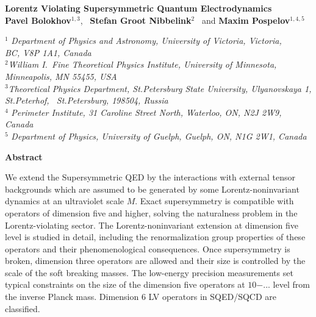 \documentclass[12pt]{revtex4}
\begin{document}
\begin{titlepage}
\renewcommand{\thefootnote}{\fnsymbol{footnote}}

\begin{center}
\vspace{0.5cm}

\large {\bf Lorentz Violating Supersymmetric Quantum Electrodynamics}\\[3mm]
  
\vspace*{0.5cm}
\normalsize
{\bf Pavel Bolokhov}$^{1,3}$, ~{\bf Stefan Groot Nibbelink}$^{2}$
\ and
{\bf Maxim Pospelov}$^{1,4,5}$%

\vspace*{0.5cm}
$^{1}$ {\it Department of Physics and Astronomy,
University of Victoria, Victoria,\\ BC, V8P 1A1, Canada}\\
$^{2}${\it William I.\ Fine Theoretical Physics Institute,
University of Minnesota,\\ Minneapolis, MN 55455, USA}\\
$^{3}${\it Theoretical Physics Department, St.Petersburg State University, Ulyanovskaya 1,\\
St.Peterhof, ~St.Petersburg, 198504, Russia}\\
$^{4}$ {\it Perimeter Institute, 31 Caroline Street North,
Waterloo, ON,  N2J 2W9,
Canada}\\
$^{5}$ {\it Department of Physics,
 University of Guelph,
 Guelph, ON,  N1G 2W1, Canada}
 \end{center}

\centerline{\large\bf Abstract}
We extend the Supersymmetric QED by the interactions with external 
tensor backgrounds which are assumed to be generated by some Lorentz-noninvariant 
dynamics at an ultraviolet scale $M$. Exact supersymmetry is compatible with operators 
of dimension five and higher, solving the naturalness problem in the 
Lorentz-violating sector. The Lorentz-noninvariant extension at 
dimension five level is studied in detail, including the 
renormalization group properties of these 
operators and their phenomenological consequences. 
Once supersymmetry is broken, dimension three operators are 
allowed and their size is controlled by the scale of the 
soft breaking masses. The low-energy precision measurements 
set typical constraints on the size of the dimension 
five operators at $10{-...}$ level from the inverse Planck mass. 
Dimension 6 LV operators in SQED/SQCD are classified.



\end{titlepage}
\end{document}
